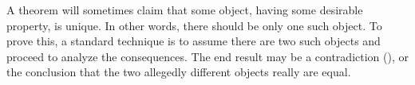 A theorem will sometimes claim that some object, having some desirable property, is unique.  In other words, there should be only one such object.  To prove this, a standard technique is to assume there are two such objects and proceed to analyze the consequences.  The end result may be a contradiction (), or the conclusion that the two allegedly different objects really are equal.
